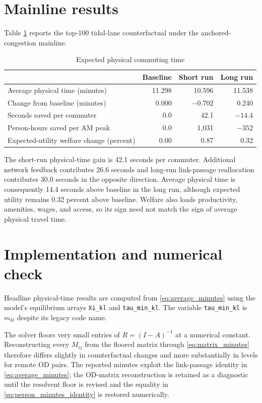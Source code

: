 \documentclass[12pt]{article}
\begin{document}
\section{Mainline results}

Table \ref{tab:physical_results} reports the top-100 tidal-lane
counterfactual under the anchored-congestion mainline.
\begin{table}[ht]
\centering
\caption{Expected physical commuting time}
\label{tab:physical_results}
\begin{tabular}{lrrr}
\toprule
 & Baseline & Short run & Long run \\
\midrule
Average physical time (minutes) & 11.298 & 10.596 & 11.538 \\
Change from baseline (minutes) & 0.000 & $-0.702$ & 0.240 \\
Seconds saved per commuter & 0.0 & 42.1 & $-14.4$ \\
Person-hours saved per AM peak & 0.0 & 1,031 & $-352$ \\
Expected-utility welfare change (percent) & 0.00 & 0.87 & 0.32 \\
\bottomrule
\end{tabular}
\end{table}

The short-run physical-time gain is 42.1 seconds per commuter. Additional
network feedback contributes 26.6 seconds and long-run link-passage
reallocation contributes 30.0 seconds in the opposite direction. Average
physical time is consequently 14.4 seconds above baseline in the long run,
although expected utility remains 0.32 percent above baseline. Welfare also
loads productivity, amenities, wages, and access, so its sign need not match
the sign of average physical travel time.

\section{Implementation and numerical check}

Headline physical-time results are computed from
\eqref{eq:average_minutes} using the model's equilibrium arrays
\texttt{Xi\_kl} and \texttt{tau\_min\_kl}. The variable
\texttt{tau\_min\_kl} is $m_{kl}$ despite its legacy code name.

The solver floors very small entries of $R=(I-A)^{-1}$ at a numerical
constant. Reconstructing every $M_{ij}$ from the floored matrix through
\eqref{eq:matrix_minutes} therefore differs slightly in counterfactual
changes and more substantially in levels for remote OD pairs. The reported
minutes exploit the link-passage identity in \eqref{eq:average_minutes}; the
OD-matrix reconstruction is retained as a diagnostic until the resolvent
floor is revised and the equality in \eqref{eq:person_minutes_identity} is
restored numerically.
\end{document}
